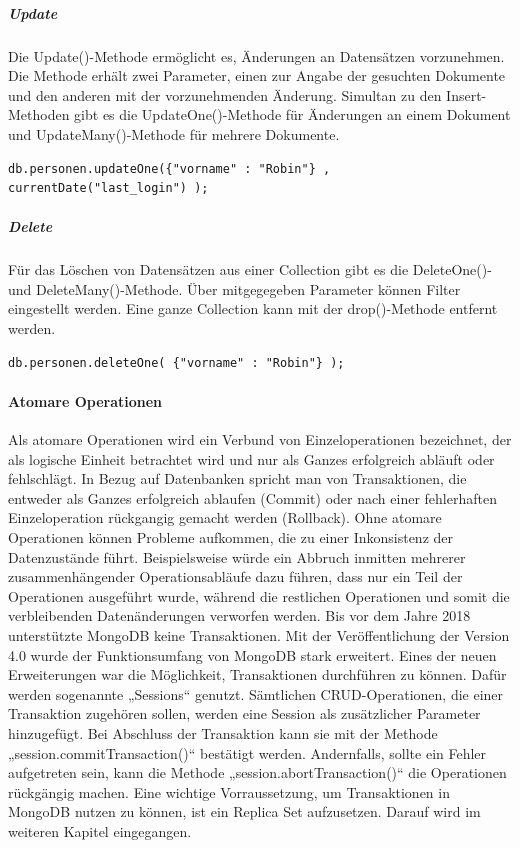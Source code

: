 \noindent
\subparagraph{Update}
Die Update()-Methode ermöglicht es, Änderungen an Datensätzen vorzunehmen.  Die Methode erhält zwei Parameter, einen zur Angabe der gesuchten Dokumente und den anderen mit  der vorzunehmenden Änderung. Simultan zu den Insert-Methoden gibt es die UpdateOne()-Methode für Änderungen an einem Dokument und UpdateMany()-Methode für mehrere Dokumente.
\newline

\begin{lstlisting}[caption=MongoDB Update, label=lst:MongoDBUpdate]
db.personen.updateOne({"vorname" : "Robin"} , currentDate("last_login") );

\end{lstlisting}

\noindent
\subparagraph{Delete}
Für das Löschen von Datensätzen aus einer Collection gibt es die DeleteOne()- und DeleteMany()-Methode. Über mitgegegeben Parameter können Filter eingestellt werden. Eine ganze Collection kann mit der drop()-Methode entfernt werden.
\newline

\begin{lstlisting}[caption=MongoDB Remove, label=lst:MongoDBRemove]
db.personen.deleteOne( {"vorname" : "Robin"} );

\end{lstlisting}

\noindent
\paragraph{Atomare Operationen}
Als atomare Operationen wird ein Verbund von Einzeloperationen bezeichnet, der als logische Einheit betrachtet wird und nur als Ganzes erfolgreich abläuft oder fehlschlägt. In Bezug auf Datenbanken spricht man von Transaktionen, die entweder als Ganzes erfolgreich ablaufen (Commit) oder nach einer fehlerhaften Einzeloperation rückgangig gemacht werden (Rollback). Ohne atomare Operationen können Probleme aufkommen, die zu einer Inkonsistenz der Datenzustände führt. Beispielsweise würde ein Abbruch inmitten mehrerer zusammenhängender Operationsabläufe dazu führen,  dass nur ein Teil der Operationen ausgeführt wurde, während die restlichen Operationen und somit die verbleibenden Datenänderungen verworfen werden.
\newline
Bis vor dem Jahre 2018 unterstützte MongoDB keine Transaktionen. Mit der Veröffentlichung der Version 4.0 wurde der Funktionsumfang von MongoDB stark erweitert. Eines der neuen Erweiterungen war die Möglichkeit, Transaktionen durchführen zu können. Dafür werden sogenannte „Sessions“ genutzt. Sämtlichen CRUD-Operationen, die einer Transaktion zugehören sollen, werden eine Session als zusätzlicher Parameter hinzugefügt.  Bei Abschluss der Transaktion kann sie mit der Methode „session.commitTransaction()“ bestätigt werden. Andernfalls, sollte ein Fehler aufgetreten sein, kann die Methode „session.abortTransaction()“ die Operationen rückgängig machen. Eine wichtige Vorraussetzung, um Transaktionen in MongoDB nutzen zu können, ist ein Replica Set aufzusetzen. Darauf wird im weiteren Kapitel eingegangen. 
\newline


